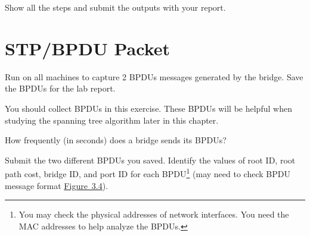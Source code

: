 \documentclass{../UTNetLab}
\begin{document}
Show all the steps and submit the  outputs with your report.

\section{STP/BPDU Packet}
Run  on all machines to capture 2 BPDUs messages generated by the bridge.
Save the BPDUs for the lab report.



You should collect BPDUs in this exercise.
These BPDUs will be helpful when studying the spanning tree algorithm later in this chapter.

\begin{report}
    \item How frequently (in seconds) does a bridge sends its BPDUs?

    \item Submit the two different BPDUs you saved.
    Identify the values of root ID, root path cost, bridge ID, and port ID for each BPDU\footnote{You may check the physical addresses of network interfaces.
        You need the MAC addresses to help analyze the BPDUs.} (may need to check BPDU message format \hyperref[fig:3.4]{Figure~3.4}).
\end{report}
\end{document}

